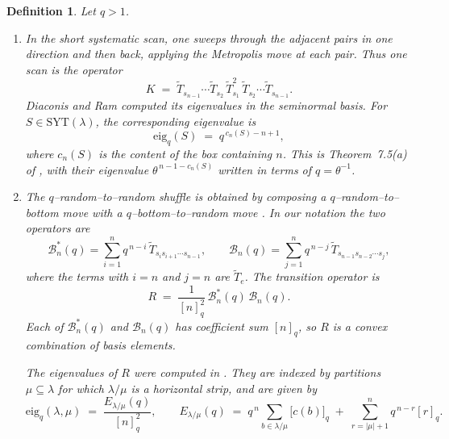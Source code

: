 \documentclass[11pt]{article}
\theoremstyle{plain}  %
\newtheorem{definition}[theorem]{Definition}
\newcommand{\eig}{\text{eig}} %
\begin{document}
\begin{definition}\label{def:three}
Let $q>1$.
\begin{enumerate}

\item In the \emph{short systematic scan}, one sweeps through the adjacent pairs in one
direction and then back, applying the Metropolis move at each pair. Thus one scan is the
operator
\[
  K \;=\; \widetilde T_{s_{n-1}}\cdots\widetilde T_{s_2}\,
          \widetilde T_{s_1}^{2}\,
          \widetilde T_{s_2}\cdots\widetilde T_{s_{n-1}} .
\]
Diaconis and Ram \cite{DiaconisRam2000} computed its eigenvalues in the seminormal basis.
For $S\in\mathrm{SYT}(\lambda)$, the corresponding eigenvalue is
\begin{equation}\label{eq:scaneig}
  \eig_q(S) \;=\; q^{\,c_n(S)-n+1} ,
\end{equation}
where $c_n(S)$ is the content of the box containing $n$. This is Theorem~7.5(a) of
\cite{DiaconisRam2000}, with their eigenvalue
$\theta^{\,n-1-c_n(S)}$ written in terms of $q=\theta^{-1}$.

\item The \emph{$q$--random--to--random shuffle} is obtained by composing a
$q$--random--to--bottom move with a $q$--bottom--to--random move
\cite{AxelrodFreedBraunerChiangComminsLang2024}. In our notation the two operators are
\[
  \mathcal{B}^{*}_n(q) = \sum_{i=1}^{n} q^{\,n-i}\,
        \widetilde T_{s_i s_{i+1}\cdots s_{n-1}},
  \qquad
  \mathcal{B}_n(q) = \sum_{j=1}^{n} q^{\,n-j}\,
        \widetilde T_{s_{n-1}s_{n-2}\cdots s_j},
\]
where the terms with $i=n$ and $j=n$ are $\widetilde T_e$. The transition operator is
\[
  R \;=\; \frac{1}{[n]_q^{2}}\,\mathcal{B}^{*}_n(q)\,\mathcal{B}_n(q).
\]
Each of $\mathcal{B}^{*}_n(q)$ and $\mathcal{B}_n(q)$ has coefficient sum $[n]_q$, so
$R$ is a convex combination of basis elements.

The eigenvalues of $R$ were computed in
\cite{AxelrodFreedBraunerChiangComminsLang2024}. They are indexed by partitions
$\mu\subseteq\lambda$ for which $\lambda/\mu$ is a horizontal strip, and are given by
\begin{equation}\label{eq:r2reig}
  \eig_q(\lambda,\mu) \;=\; \frac{E_{\lambda/\mu}(q)}{[n]_q^{2}},
  \qquad
  E_{\lambda/\mu}(q) \;=\; q^{\,n}\sum_{b\in\lambda/\mu}\bigl[c(b)\bigr]_q
     \;+\; \sum_{r=|\mu|+1}^{n} q^{\,n-r}[r]_q .
\end{equation}

\end{enumerate}
\end{definition}
\end{document}
